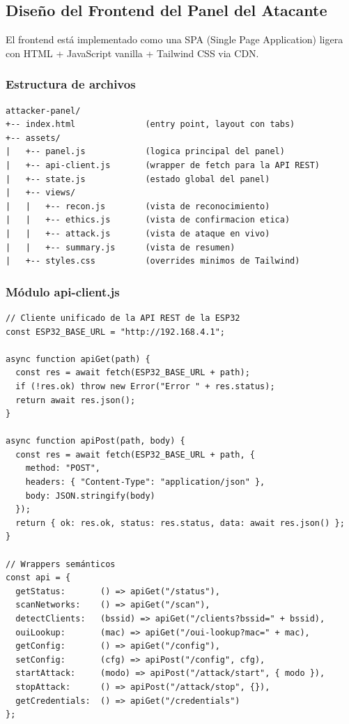\documentclass[11pt,a4paper]{article}
\begin{document}
\subsection{Diseño del Frontend del Panel del Atacante}

El frontend está implementado como una SPA (Single Page Application)
ligera con HTML + JavaScript vanilla + Tailwind CSS via CDN.

\subsubsection{Estructura de archivos}

\begin{lstlisting}
attacker-panel/
+-- index.html              (entry point, layout con tabs)
+-- assets/
|   +-- panel.js            (logica principal del panel)
|   +-- api-client.js       (wrapper de fetch para la API REST)
|   +-- state.js            (estado global del panel)
|   +-- views/
|   |   +-- recon.js        (vista de reconocimiento)
|   |   +-- ethics.js       (vista de confirmacion etica)
|   |   +-- attack.js       (vista de ataque en vivo)
|   |   +-- summary.js      (vista de resumen)
|   +-- styles.css          (overrides minimos de Tailwind)
\end{lstlisting}

\subsubsection{Módulo api-client.js}

\begin{lstlisting}
// Cliente unificado de la API REST de la ESP32
const ESP32_BASE_URL = "http://192.168.4.1";

async function apiGet(path) {
  const res = await fetch(ESP32_BASE_URL + path);
  if (!res.ok) throw new Error("Error " + res.status);
  return await res.json();
}

async function apiPost(path, body) {
  const res = await fetch(ESP32_BASE_URL + path, {
    method: "POST",
    headers: { "Content-Type": "application/json" },
    body: JSON.stringify(body)
  });
  return { ok: res.ok, status: res.status, data: await res.json() };
}

// Wrappers semánticos
const api = {
  getStatus:       () => apiGet("/status"),
  scanNetworks:    () => apiGet("/scan"),
  detectClients:   (bssid) => apiGet("/clients?bssid=" + bssid),
  ouiLookup:       (mac) => apiGet("/oui-lookup?mac=" + mac),
  getConfig:       () => apiGet("/config"),
  setConfig:       (cfg) => apiPost("/config", cfg),
  startAttack:     (modo) => apiPost("/attack/start", { modo }),
  stopAttack:      () => apiPost("/attack/stop", {}),
  getCredentials:  () => apiGet("/credentials")
};
\end{lstlisting}
\end{document}
